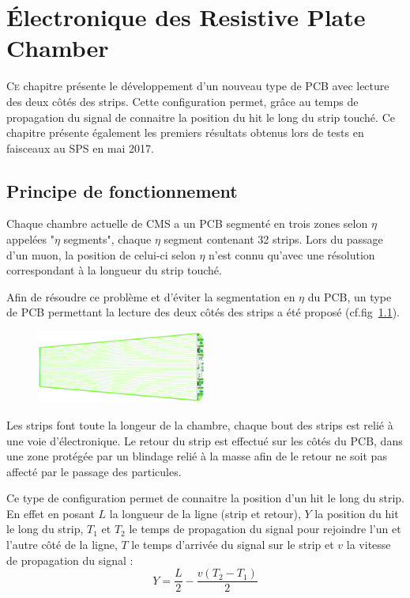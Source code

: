 \chapter{Électronique des Resistive Plate Chamber}
\label{time}
\renewcommand\chapterillustration{ELE/ele}
\ThisULCornerWallPaper{1}{\chapterillustration}
\minitoc

\lettrine[lines=4, slope=-0.5em]{C}{e} chapitre présente le développement d'un nouveau type de PCB avec lecture des deux côtés des strips. Cette configuration permet, grâce au temps de propagation du signal de connaitre la position du hit le long du strip touché. Ce chapitre présente également les premiers résultats obtenus lors de tests en faisceaux au SPS en mai 2017.

\section{Principe de fonctionnement}
\vspace{-0.5cm}
Chaque chambre actuelle de CMS a un PCB segmenté en trois zones selon $\eta$ appelées "$\eta$ segments", chaque $\eta$ segment contenant \num{32} strips. Lors du passage d'un muon, la position de celui-ci selon $\eta$ n'est connu qu'avec une résolution correspondant à la longueur du strip touché.

Afin de résoudre ce problème et d'éviter la segmentation en $\eta$ du PCB, un type de PCB permettant la lecture des deux côtés des strips a été proposé (cf.fig~\ref{PCB1}).
\vspace*{-0.5cm}
\begin{figure}[ht!]
	\centering
	\includegraphics[width=0.50\textwidth]{ELE/PCB1.png}
	\label{PCB1}
\end{figure}
\vspace{-0.3cm}
Les strips font toute la longeur de la chambre, chaque bout des strips est relié à une voie d'électronique. Le retour du strip est effectué sur les côtés du PCB, dans une zone protégée par un blindage relié à la masse afin de le retour ne soit pas affecté par le passage des particules.

Ce type de configuration permet de connaitre la position d'un hit le long du strip. En effet en posant $L$ la longueur de la ligne (strip et retour), $Y$ la position du hit le long du strip, $T_1$ et $T_2$ le temps de propagation du signal pour rejoindre l'un et l'autre côté de la ligne, $T$ le temps d'arrivée du signal sur le strip et $v$ la vitesse de propagation du signal :
\begin{equation}
\label{eqqq}
Y=\frac{L}{2}-\frac{v(T_2-T_1)}{2}
\end{equation} 

